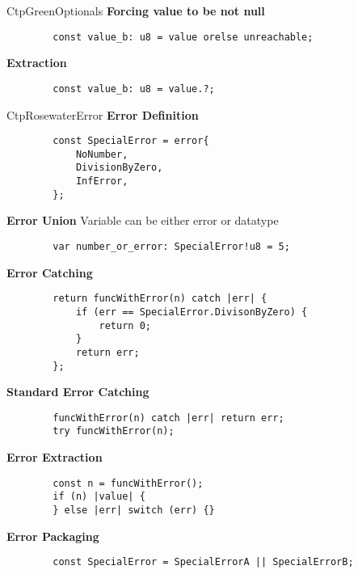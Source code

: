 \documentclass[10pt,a4paper]{article}
\begin{document}
\begin{multicols*}{3}
\begin{mycolorbox}{CtpGreen}{Optionals}
	\textbf{Forcing value to be not null}
	\begin{verbatim}
		const value_b: u8 = value orelse unreachable;
	\end{verbatim}

	\textbf{Extraction}
	\begin{verbatim}
		const value_b: u8 = value.?;
	\end{verbatim}
\end{mycolorbox}

\begin{mycolorbox}{CtpRosewater}{Error}
	\textbf{Error Definition}
	\begin{verbatim}
		const SpecialError = error{
			NoNumber,
			DivisionByZero,
			InfError,
		};
	\end{verbatim}

	\textbf{Error Union} Variable can be either error or datatype
	\begin{verbatim}
		var number_or_error: SpecialError!u8 = 5;
	\end{verbatim}

	\textbf{Error Catching}
	\begin{verbatim}
		return funcWithError(n) catch |err| {
			if (err == SpecialError.DivisonByZero) {
				return 0;
			}
			return err;
		};
	\end{verbatim}

	\textbf{Standard Error Catching}
	\begin{verbatim}
		funcWithError(n) catch |err| return err;
		try funcWithError(n);
	\end{verbatim}

	\textbf{Error Extraction}
	\begin{verbatim}
		const n = funcWithError();
		if (n) |value| {
		} else |err| switch (err) {}
	\end{verbatim}

	\textbf{Error Packaging}
	\begin{verbatim}
		const SpecialError = SpecialErrorA || SpecialErrorB;
	\end{verbatim}
\end{mycolorbox}



\end{multicols*}
\end{document}

